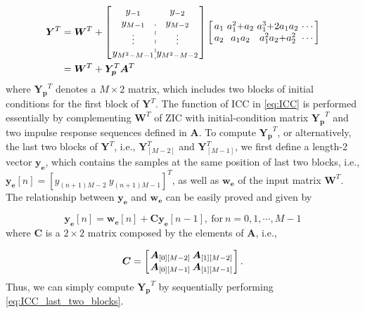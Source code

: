 \begin{equation}
    \label{eq:ICC}
    \begin{aligned}
        \bm{Y}^T &= \bm{W}^T + \left[\arraycolsep=1.0pt\def\arraystretch{1.0}
                \begin{array}{c:c}
                y_{-1} & y_{-2} \\ 
                y_{M-1} & y_{M-2} \\
                \vdots & \vdots \\
                y_{M^2-M-1} & y_{M^2-M-2}
                \end{array}\right]  
                \left[\arraycolsep=1.6pt\def\arraystretch{1.0}
                    \begin{array}{cccc}
                    a_1 & a_1^2{+}a_2 & a_1^3{+}2a_1a_2 & \cdots \\ 
                    a_2 & a_1a_2 & a_1^2a_2{+}a_2^2 & \cdots \\
                    \end{array}\right] \\
        & = \bm{W}^T + \bm{Y_p}^T  \bm{A}^T
    \end{aligned}
\end{equation}
where $\bm{Y_p}^T$ denotes a $M{\times}2$ matrix, which includes two blocks of initial conditions for the first block of $\bm{Y}^T$.
The function of ICC in \eqref{eq:ICC} is performed essentially by complementing 
$\bm{W}^T$ of ZIC with initial-condition matrix $\bm{Y_p}^T$ and two impulse response sequences defined in $\bm{A}$.
To compute $\bm{Y_p}^T$, or alternatively, the last two blocks of $\bm{Y}^T$, i.e.,
$\bm{Y}^T_{[M-2]}$ and $\bm{Y}^T_{[M-1]}$,
we first define a length-2 vector $\bm{y_e}$, which contains the samples at the
same position of last two blocks, i.e.,
$\bm{y_e}[n] {=} \left[y_{(n+1)M{-}2} ~ y_{(n+1)M{-}1}\right]^T$, 
as well as $\bm{w_e}$ of the input matrix $\bm{W}^T$.
The relationship between $\bm{y_e}$ and $\bm{w_e}$ can be easily proved and given by

\begin{equation}
    \label{eq:ICC_last_two_blocks}
        \bm{y_e}[n] = \bm{w_e}[n]+\bm{C}\bm{y_e}[n{-}1], ~ \text{for} ~ n=0,1,\cdots, M{-}1
\end{equation}
where $\bm{C}$ is a $2{\times}2$ matrix composed by the elements of $\bm{A}$, i.e.,

\begin{equation*}
    \bm{C} = \left[\arraycolsep=1.0pt\def\arraystretch{1.0}
        \begin{array}{cc}
        \bm{A}_{[0][M-2]} & \bm{A}_{[1][M-2]} \\ 
        \bm{A}_{[0][M-1]} & \bm{A}_{[1][M-1]} \\ 
        \end{array}\right].
\end{equation*}
Thus, we can simply compute $\bm{Y_p}^T$ by sequentially performing \eqref{eq:ICC_last_two_blocks}. 


